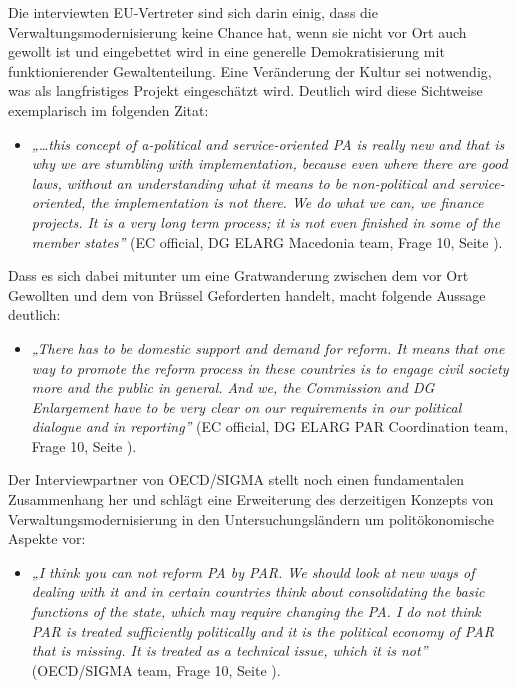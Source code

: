 Die interviewten EU-Vertreter sind sich darin einig, dass die Verwaltungsmodernisierung keine Chance hat, wenn sie nicht vor Ort auch gewollt ist und eingebettet wird in eine generelle Demokratisierung mit funktionierender Gewaltenteilung. Eine Veränderung der Kultur sei notwendig, was als langfristiges Projekt eingeschätzt wird. Deutlich wird diese Sichtweise exemplarisch im folgenden Zitat:
\begin{itemize}[label={}]
\item \textit{„…this concept of a-political and service-oriented PA is really new and that is why we are stumbling with implementation, because even where there are good laws, without an understanding what it means to be non-political and service-oriented, the implementation is not there. We do what we can, we finance projects. It is a very long term process; it is not even finished in some of the member states”} (EC official, DG ELARG Macedonia team, Frage 10, Seite \pageref{sec:montenegro2}).
\end{itemize}
Dass es sich dabei mitunter um eine Gratwanderung zwischen dem vor Ort Gewollten und dem von Brüssel Geforderten handelt, macht folgende Aussage deutlich:
\begin{itemize}[label={}]
\item \textit{„There has to be domestic support and demand for reform. It means that one way to promote the reform process in these countries is to engage civil society more and the public in general. And we, the Commission and DG Enlargement have to be very clear on our requirements in our political dialogue and in reporting”} (EC official, DG ELARG PAR Coordination team, Frage 10, Seite \pageref{sec:montenegro2}).
\end{itemize}
Der Interviewpartner von OECD/SIGMA stellt noch einen fundamentalen Zusammenhang her und schlägt eine Erweiterung des derzeitigen Konzepts von Verwaltungsmodernisierung in den Untersuchungsländern um politökonomische Aspekte vor:
\begin{itemize}[label={}]
\item \textit{„I think you can not reform PA by PAR. We should look at new ways of dealing with it and in certain countries think about consolidating the basic functions of the state, which may require changing the PA. I do not think PAR is treated sufficiently politically and it is the political economy of PAR that is missing. It is treated as a technical issue, which it is not”} (OECD/SIGMA team, Frage 10, Seite \pageref{sec:montenegro2}).
\end{itemize}

